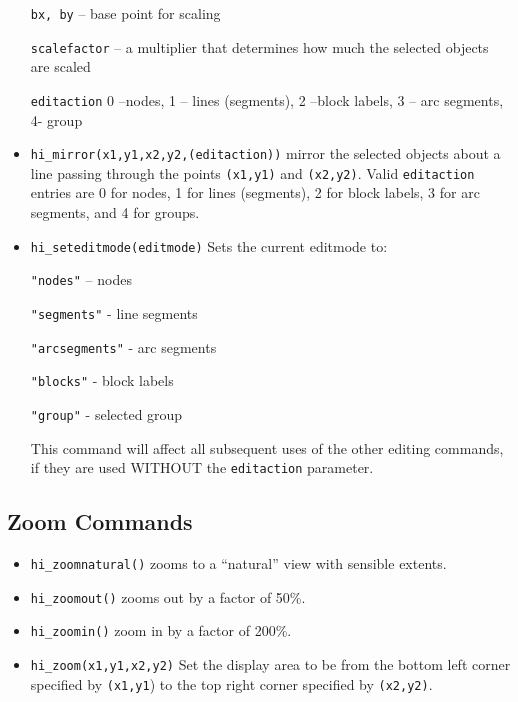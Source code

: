 \begin{itemize}
\texttt{bx, by} -- base point for scaling

\texttt{scalefactor} -- a multiplier that determines how much the selected
objects are scaled

\texttt{editaction} 0 --nodes, 1 -- lines (segments), 2 --block labels, 3 --
arc segments, 4- group

\item \texttt{hi\_mirror(x1,y1,x2,y2,(editaction))} mirror the selected objects about
a line passing through the points \texttt{(x1,y1)} and
\texttt{(x2,y2)}. Valid \texttt{editaction} entries are 0 for
nodes, 1 for lines (segments), 2 for block labels, 3 for arc
segments, and 4 for groups.

\item \texttt{hi\_seteditmode(editmode)} Sets the current editmode to:

\texttt{"nodes"} -- nodes

\texttt{"segments"} - line segments

\texttt{"arcsegments"} - arc segments

\texttt{"blocks"} - block labels

\texttt{"group"} - selected group

This command will affect all subsequent uses of the other editing
commands, if they are used WITHOUT the \texttt{editaction}
parameter.
\end{itemize}

\subsection{Zoom Commands}

\begin{itemize}
\item \texttt{hi\_zoomnatural()} zooms to a ``natural'' view with sensible extents.

\item \texttt{hi\_zoomout()} zooms out by a factor of 50{\%}.

\item \texttt{hi\_zoomin()} zoom in by a factor of 200{\%}.

\item \texttt{hi\_zoom(x1,y1,x2,y2)} Set the display area to be from the bottom left
corner specified by \texttt{(x1,y1}) to the top right corner
specified by \texttt{(x2,y2)}.
\end{itemize}

